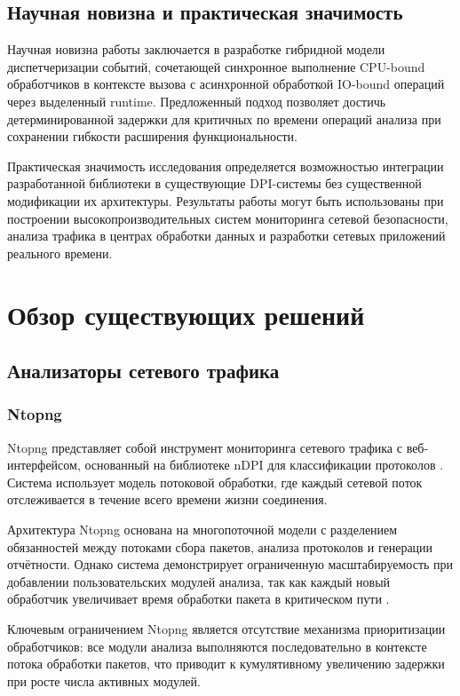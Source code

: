 \documentclass[12pt,a4paper]{report}
\begin{document}
\section{Научная новизна и практическая значимость}
Научная новизна работы заключается в разработке гибридной модели диспетчеризации событий, сочетающей синхронное выполнение CPU-bound обработчиков в контексте вызова с асинхронной обработкой IO-bound операций через выделенный runtime. Предложенный подход позволяет достичь детерминированной задержки для критичных по времени операций анализа при сохранении гибкости расширения функциональности.

Практическая значимость исследования определяется возможностью интеграции разработанной библиотеки в существующие DPI-системы без существенной модификации их архитектуры. Результаты работы могут быть использованы при построении высокопроизводительных систем мониторинга сетевой безопасности, анализа трафика в центрах обработки данных и разработки сетевых приложений реального времени.

\chapter{Обзор существующих решений}
\section{Анализаторы сетевого трафика}
\subsection{Ntopng}
Ntopng представляет собой инструмент мониторинга сетевого трафика с веб-интерфейсом, основанный на библиотеке nDPI для классификации протоколов \cite{ntopng2023}. Система использует модель потоковой обработки, где каждый сетевой поток отслеживается в течение всего времени жизни соединения.

Архитектура Ntopng основана на многопоточной модели с разделением обязанностей между потоками сбора пакетов, анализа протоколов и генерации отчётности. Однако система демонстрирует ограниченную масштабируемость при добавлении пользовательских модулей анализа, так как каждый новый обработчик увеличивает время обработки пакета в критическом пути \cite{deri2014high}.

Ключевым ограничением Ntopng является отсутствие механизма приоритизации обработчиков: все модули анализа выполняются последовательно в контексте потока обработки пакетов, что приводит к кумулятивному увеличению задержки при росте числа активных модулей.
\end{document}
